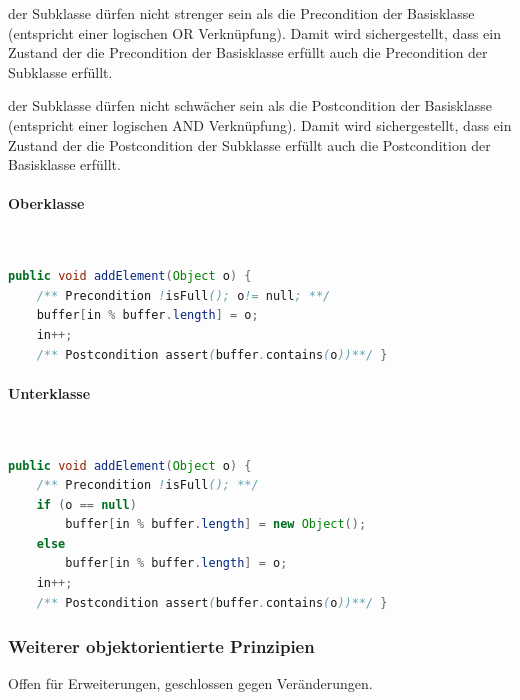 \documentclass[a4paper,fontsize=9pt, DIV=calc]{scrartcl}
\begin{document}
\begin{multicols}{2}
\begin{description}[leftmargin=*]
    \item[Preconditions] der Subklasse dürfen nicht strenger sein als die Precondition der Basisklasse (entspricht einer logischen OR Verknüpfung). Damit wird sichergestellt, dass ein Zustand der die Precondition der Basisklasse erfüllt auch die Precondition der Subklasse erfüllt.
    \item[Postconditions] der Subklasse dürfen nicht schwächer sein als die Postcondition der Basisklasse (entspricht einer logischen AND Verknüpfung). Damit wird sichergestellt, dass ein Zustand der die Postcondition der Subklasse erfüllt auch die Postcondition der Basisklasse erfüllt.
\end{description}

\vspace{-1.5em}
\paragraph{Oberklasse}$ $\\[-1em]
\begin{lstlisting}[style = siemens, language = Java, caption={}]
public void addElement(Object o) {
    /** Precondition !isFull(); o!= null; **/
    buffer[in % buffer.length] = o;
    in++;
    /** Postcondition assert(buffer.contains(o))**/ }
\end{lstlisting}

\vspace{-1.5em}
\paragraph{Unterklasse}$ $\\[-1em]
\begin{lstlisting}[style = siemens, language = Java, caption={}]
public void addElement(Object o) {
    /** Precondition !isFull(); **/
    if (o == null)
        buffer[in % buffer.length] = new Object();
    else
        buffer[in % buffer.length] = o;
    in++;
    /** Postcondition assert(buffer.contains(o))**/ }
\end{lstlisting}


\subsubsection{Weiterer objektorientierte Prinzipien}

\begin{description}[leftmargin=*]\itemsep-2mm
\item[Open-Closed-Prinzip] Offen für Erweiterungen, geschlossen gegen Veränderungen. 


\end{description}
\end{multicols}
\end{document}
